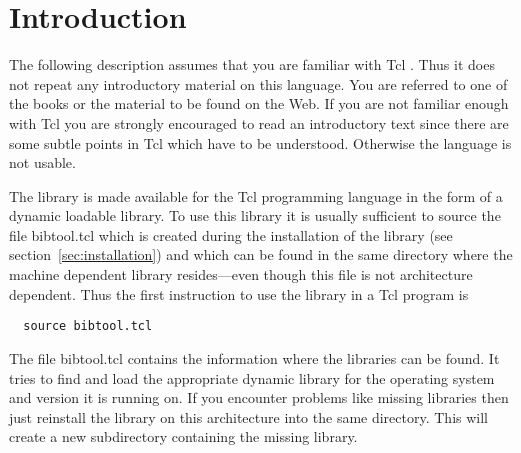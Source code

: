 
\newcommand\code[1]{{\tt #1}}
\newcommand\meta[1]{{\it #1\/}}
\newcommand\file[1]{{\sf #1}}

\newcommand\TclSummaryLabel[1]{{\bf #1\hss}}
\newcommand\TclSummary[3]{\TclSummaryOO{bibtool #1
    #2}{#3}\index{bibtool!#1}}
\newcommand\TclSummaryOO[2]{\begin{list}{}{%
      \parskip=0pt
      \parsep=0pt
      \topsep=0pt
      \rightmargin=2em
      \advance\leftmargin \rightmargin
      \let\makelabel\TclSummaryLabel}
  \item[#1] \ \par #2
  \end{list}}

\section{Introduction}

The following description assumes that you are familiar with Tcl
\cite{ousterhout:tcl,welch:practical}.  Thus it does not repeat any
introductory material on this language.  You are referred to one of
the books or the material to be found on the Web.  If you are not
familiar enough with Tcl you are strongly encouraged to read an
introductory text since there are some subtle points in Tcl which have
to be understood.  Otherwise the language is not usable.

The \BibTool{} library is made available for the Tcl programming
language in the form of a dynamic loadable library. To use this
library it is usually sufficient to source the file \file{bibtool.tcl}
which is created during the installation of the library (see
section~\ref{sec:installation}) and which can be found in the same
directory where the machine dependent library resides---even though
this file is not architecture dependent. Thus the first instruction to
use the library in a Tcl program is

\begin{verbatim}
  source bibtool.tcl
\end{verbatim}
The file \file{bibtool.tcl} contains the information where the
libraries can be found. It tries to find and load the appropriate
dynamic library for the operating system and version it is running on.
If you encounter problems like missing libraries then just reinstall
the \BibTool{} library on this architecture into the same directory.
This will create a new subdirectory containing the missing library.


